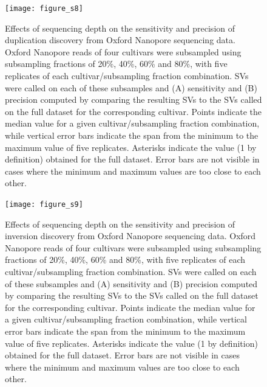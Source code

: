\documentclass[12pt]{article}
\newenvironment{cfigure}
	{\begin{figure} \centering}
	{\end{figure}}
\begin{document}
\clearpage%

\begin{cfigure}
	\texttt{[image: figure\_s8]}

	\caption[Effects of sequencing depth on the sensitivity and precision of duplication discovery from Oxford Nanopore sequencing data]{
		Effects of sequencing depth on the sensitivity and precision of duplication discovery from Oxford Nanopore sequencing data.
		Oxford Nanopore reads of four cultivars were subsampled using subsampling fractions of 20\%, 40\%, 60\% and 80\%, with five replicates of each cultivar/subsampling fraction combination.
		SVs were called on each of these subsamples and (A) sensitivity and (B) precision computed by comparing the resulting SVs to the SVs called on the full dataset for the corresponding cultivar.
		Points indicate the median value for a given cultivar/subsampling fraction combination, while vertical error bars indicate the span from the minimum to the maximum value of five replicates.
		Asterisks indicate the value (1 by definition) obtained for the full dataset.
		Error bars are not visible in cases where the minimum and maximum values are too close to each other.
}

\label{fig_s8}

\end{cfigure}

\clearpage%

\begin{cfigure}
	\texttt{[image: figure\_s9]}

	\caption[Effects of sequencing depth on the sensitivity and precision of inversion discovery from Oxford Nanopore sequencing data]{
		Effects of sequencing depth on the sensitivity and precision of inversion discovery from Oxford Nanopore sequencing data.
		Oxford Nanopore reads of four cultivars were subsampled using subsampling fractions of 20\%, 40\%, 60\% and 80\%, with five replicates of each cultivar/subsampling fraction combination.
		SVs were called on each of these subsamples and (A) sensitivity and (B) precision computed by comparing the resulting SVs to the SVs called on the full dataset for the corresponding cultivar.
		Points indicate the median value for a given cultivar/subsampling fraction combination, while vertical error bars indicate the span from the minimum to the maximum value of five replicates.
		Asterisks indicate the value (1 by definition) obtained for the full dataset.
		Error bars are not visible in cases where the minimum and maximum values are too close to each other.
}

\label{fig_s9}

\end{cfigure}
\end{document}
